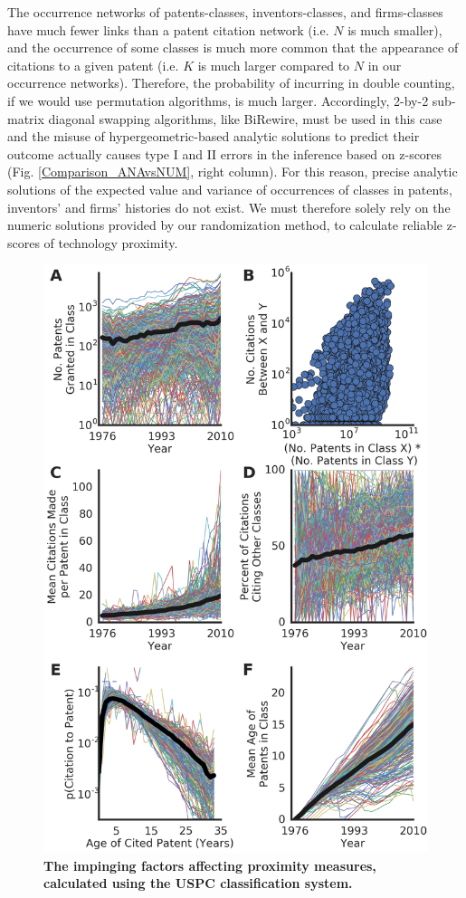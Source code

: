 \documentclass[]{svjour3}
\begin{document}
The occurrence networks of patents-classes, inventors-classes, and firms-classes have much fewer links than a patent citation network (i.e. $N$ is much smaller), and the occurrence of some classes is much more common that the appearance of citations to a given patent (i.e. $K$ is much larger compared to $N$ in our occurrence networks). Therefore, the probability of incurring in double counting, if we would use permutation algorithms, is much larger. Accordingly, 2-by-2 sub-matrix diagonal swapping algorithms, like BiRewire, must be used in this case and the misuse of hypergeometric-based analytic solutions to predict their outcome actually causes type I and II errors in the inference based on z-scores (Fig. \ref{Comparison_ANAvsNUM}, right column). For this reason, precise analytic solutions of the expected value and variance of occurrences of classes in patents, inventors' and firms' histories do not exist. We must therefore solely rely on the numeric solutions provided by our randomization method, to calculate reliable z-scores of technology proximity.        

\clearpage

\begin{figure}[]
\centering
\includegraphics[width=.7\textwidth]{figs/Impinging_Factors_USPC.png} 
\caption{\textbf{The impinging factors affecting proximity measures, calculated using the USPC classification system.}}
\end{figure}
\end{document}
